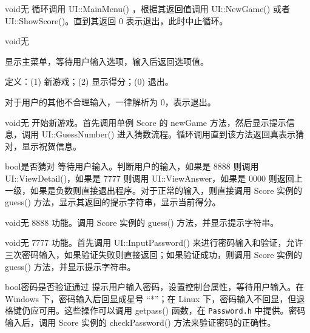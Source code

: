 {}
{void}{无}
{循环调用 UI::MainMenu() ，根据其返回值调用 UI::NewGame() 或者 UI::ShowScore()。直到其返回 0 表示退出，此时中止循环。}

{}
{void}{无}
{显示主菜单，等待用户输入选项，输入后返回选项值。

定义：(1) 新游戏；(2) 显示得分；(0) 退出。

对于用户的其他不合理输入，一律解析为 0，表示退出。}

{}
{void}{无}
{开始新游戏。首先调用单例 Score 的 newGame 方法，然后显示提示信息，调用 UI::GuessNumber() 进入猜数流程。循环调用直到该方法返回真表示猜对，显示祝贺信息。}

{}
{bool}{是否猜对}
{等待用户输入。判断用户的输入，如果是 8888 则调用 UI::ViewDetail()，如果是 7777 则调用 UI::ViewAnswer，如果是 0000 则返回上一级，如果是负数则直接退出程序。对于正常的输入，则直接调用 Score 实例的 guess() 方法，显示其返回的提示字符串，显示当前得分。}

{}
{void}{无}
{8888 功能。调用 Score 实例的 guess() 方法，并显示提示字符串。}

{}
{void}{无}
{7777 功能。首先调用 UI::InputPassword() 来进行密码输入和验证，允许三次密码输入，如果验证失败则直接返回；如果验证成功，则调用 Score 实例的 guess() 方法，并显示提示字符串。}


{}
{bool}{密码是否验证通过}
{提示用户输入密码，设置控制台属性，等待用户输入。在 Windows 下，密码输入后回显成星号 “*”；在 Linux 下，密码输入不回显，但退格键仍应可用。这些操作可以调用 getpass() 函数，在 {\tt Password.h} 中提供。密码输入后，调用 Score 实例的 checkPassword() 方法来验证密码的正确性。}

















